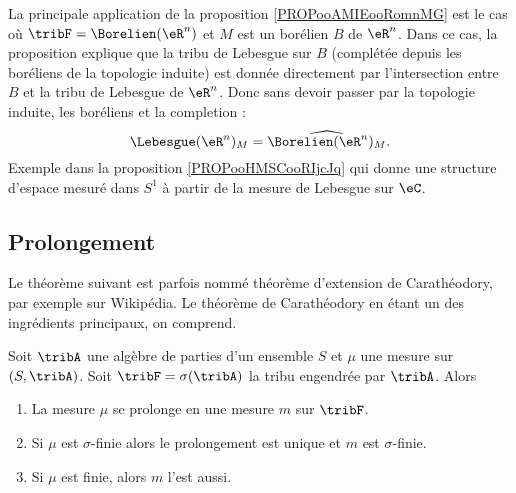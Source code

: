 \begin{normaltext}
	La principale application de la proposition \ref{PROPooAMIEooRomnMG} est le cas où \( \tribF=\Borelien(\eR^n)\) et \( M\) est un borélien \( B\) de \( \eR^n\). Dans ce cas, la proposition explique que la tribu de Lebesgue sur \( B\) (complétée depuis les boréliens de la topologie induite) est donnée directement par l'intersection entre \( B\) et la tribu de Lebesgue de \( \eR^n\). Donc sans devoir passer par la topologie induite, les boréliens et la completion :
	\begin{equation}
		\Lebesgue(\eR^n)_M=\widehat{\Borelien(\eR^n)_M}.
	\end{equation}
	Exemple dans la proposition \ref{PROPooHMSCooRIjcJq} qui donne une structure d'espace mesuré dans \( S^1\) à partir de la mesure de Lebesgue sur \( \eC\).
\end{normaltext}

\subsection{Prolongement}

Le théorème suivant est parfois nommé théorème d'extension de Carathéodory, par exemple sur Wikipédia. Le théorème de Carathéodory en étant un des ingrédients principaux, on comprend.
\begin{theorem}    \label{ThoLCQoojiFfZ}
	Soit \( \tribA\) une algèbre de parties d'un ensemble \( S\) et \( \mu\) une mesure sur \( (S,\tribA)\). Soit \( \tribF=\sigma(\tribA)\) la tribu engendrée par \( \tribA\). Alors
	\begin{enumerate}
		\item
		      La mesure \( \mu\) se prolonge en une mesure \( m\) sur \( \tribF\).
		\item
		      Si \( \mu\) est \( \sigma\)-finie alors le prolongement est unique et \( m\) est \( \sigma\)-finie.
		\item
		      Si \( \mu\) est finie, alors \( m\) l'est aussi.
	\end{enumerate}
\end{theorem}

